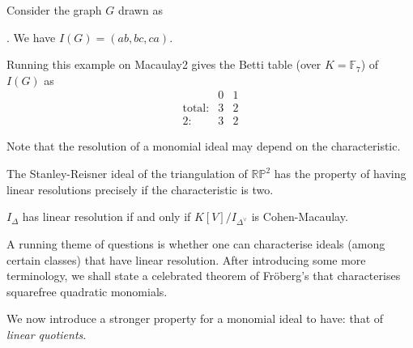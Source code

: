 \documentclass[12pt]{article}
\begin{document}
\begin{ex}
	Consider the graph $G$ drawn as
	. We have $I(G) = (ab, bc, ca)$.

	Running this example on Macaulay2 gives the Betti table (over $K = \mathbb{F}_{7}$) of $I(G)$ as
	\begin{equation*} 
		\begin{matrix}
        & 0 & 1\\
	     \text{total:}
	        & 3 & 2\\
	     2: & 3 & 2
	     \end{matrix}
	\end{equation*}	

	Note that the resolution of a monomial ideal may depend on the characteristic\footnotemark.
\end{ex}

\begin{rem}
	The Stanley-Reisner ideal of the triangulation of $\mathbb{R}\mathbb{P}^{2}$ has the property of having linear resolutions precisely if the characteristic is two.
\end{rem}

\begin{thm} \label{thm:eagon-reiner}
	$I_{\Delta}$ has linear resolution if and only if $K[V]/I_{\Delta^{\vee}}$ is Cohen-Macaulay.
\end{thm}

A running theme of questions is whether one can characterise ideals (among certain classes) that have linear resolution. After introducing some more terminology, we shall state a celebrated theorem of Fr\"{o}berg's that characterises squarefree quadratic monomials. 

We now introduce a stronger property for a monomial ideal to have: that of \emph{linear quotients}.
\end{document}
